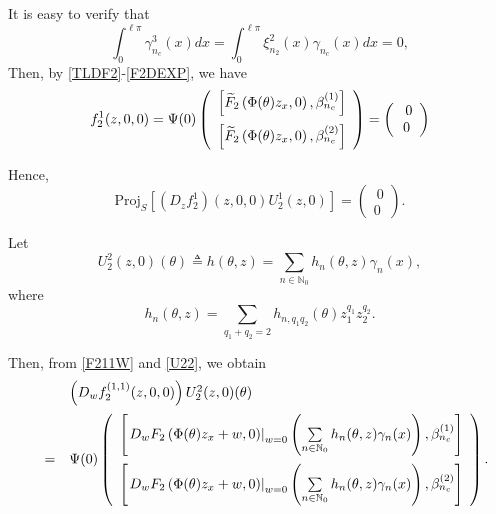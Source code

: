 \documentclass[11pt]{article}
\theoremstyle{definition}
\theoremstyle{remark}
\numberwithin{equation}{section}
\begin{document}
It is easy to verify that
$$
\int_0^{\ell\pi}\gamma_{n_c}^3(x)dx=\int_0^{\ell\pi}\xi_{n_2}^2(x)\gamma_{n_c}(x)dx =0,
$$
  Then, by \eqref{TLDF2}-\eqref{F2DEXP}, we have
$$
 f^1_2(z, 0, 0) = \Psi(0)\left(\begin{array}{c}\left[\widetilde{F}_2\left(\Phi(\theta) z_x, 0\right),\beta_{n_c}^{(1)}\right] \vspace{0.2cm}\\
 \left[\widetilde{F}_2\left(\Phi(\theta) z_x, 0\right),\beta_{n_c}^{(2)}\right]
 \end{array}
 \right)
 = \left(\begin{array}{c}\
 0\\
 0
 \end{array}\right)
$$

Hence,
\begin{equation}
\label{PDZF21}
\mbox{Proj}_{S}\left[\left(D_zf_2^1\right)(z,0,0)U_2^1(z,0)\right]= \left(\begin{array}{c}\
 0\\
 0
 \end{array}\right).
\end{equation}
\vspace{0.5cm}


 Let
\begin{equation}
\label{U22}
 U_2^2(z, 0)(\theta)\triangleq h(\theta, z)=\sum\limits_{n\in \mathbb{N}_0}  h_n(\theta,z) \gamma_n(x),
 \end{equation}
where
$$  h_n(\theta,z) =\sum\limits_{q_1+q_2=2} h_{n,q_1q_2}(\theta)z_1^{q_1}z_2^{q_2}.$$
 


Then, from \eqref{F211W} and \eqref{U22},  we obtain
 $$
\begin{array}{lll}
&& \left(D_wf^{(1,1)}_2(z,0,0)\right)U_2^2(z,0)(\theta)\vspace{0.2cm}\\
&=&\Psi(0)
   \left(\begin{array}{c}
\left[\left.D_w F_2\left(\Phi(\theta) z_x+w, 0\right)\right|_{w=0}\left(\sum\limits_{n\in \mathbb{N}_0}  h_n(\theta,z) \gamma_n(x)\right), \beta_{n_c}^{(1)}\right]\vspace{0.2cm}\\
\left[\left.D_w F_2\left(\Phi(\theta) z_x+w, 0\right)\right|_{w=0}\left(\sum\limits_{n\in \mathbb{N}_0}  h_n(\theta,z) \gamma_n(x)\right), \beta_{n_c}^{(2)}\right]
\end{array}\right).
\end{array}
 $$
\end{document}
